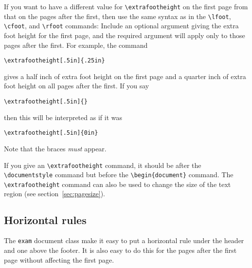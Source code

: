 \documentclass[12pt]{exam}
\begin{document}
If you want to have a different value for \verb"\extrafootheight" on
the first page from that on the pages after the first, then use the
same syntax as in the \verb"\lfoot", \verb"\cfoot", and \verb"\rfoot"
commands: Include an optional argument giving the extra foot height
for the first page, and the required argument will apply only to
those pages after the first.  For example, the command
%
\begin{center}
\verb"\extrafootheight[.5in]{.25in}"
\end{center}
%
gives a half inch of extra foot height on the first page and a
quarter inch of extra foot height on all pages after the first. 
If you say
%
\begin{center}
\verb"\extrafootheight[.5in]{}"
\end{center}
%
then this will be interpreted as if it was
%
\begin{center}
\verb"\extrafootheight[.5in]{0in}"
\end{center}
%
Note that the braces \emph{must} appear.


If you give an \verb"\extrafootheight" command, it should be after the
\verb"\documentstyle" command but before the \verb"\begin{document}"
command.  The \verb"\extrafootheight" command can also be used to
change the size of the text region (see section~\ref{sec:pagesize}).






\subsection{Horizontal rules}
\label{sec:rules}

The \verb"exam" document class make it easy to put a horizontal rule
under the header and one above the footer.  It is also easy to do
this for the pages after the first page without affecting the first
page.
\end{document}
